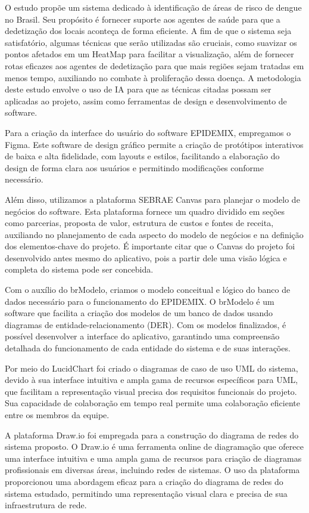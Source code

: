 O estudo propõe um sistema dedicado à identificação de áreas de risco de dengue no Brasil. Seu propósito é fornecer suporte aos agentes de saúde para que a dedetização dos locais aconteça de forma eficiente. A fim de que o sistema seja satisfatório, algumas técnicas que serão utilizadas são cruciais, como suavizar os pontos afetados em um HeatMap para facilitar a visualização, além de fornecer rotas eficazes aos agentes de dedetização para que mais regiões sejam tratadas em menos tempo, auxiliando no combate à proliferação dessa doença. A metodologia deste estudo envolve o uso de IA para que as técnicas citadas possam ser aplicadas ao projeto, assim como ferramentas de design e desenvolvimento de software. 

Para a criação da interface do usuário do software EPIDEMIX, empregamos o Figma. Este software de design gráfico permite a criação de protótipos interativos de baixa e alta fidelidade, com layouts e estilos, facilitando a elaboração do design de forma clara aos usuários e permitindo modificações conforme necessário.

Além disso, utilizamos a plataforma SEBRAE Canvas para planejar o modelo de negócios do software. Esta plataforma fornece um quadro dividido em seções como parcerias, proposta de valor, estrutura de custos e fontes de receita, auxiliando no planejamento de cada aspecto do modelo de negócios e na definição dos elementos-chave do projeto. É importante citar que o Canvas do projeto foi desenvolvido antes mesmo do aplicativo, pois a partir dele uma visão lógica e completa do sistema pode ser concebida.

Com o auxílio do brModelo, criamos o modelo conceitual e lógico do banco de dados necessário para o funcionamento do EPIDEMIX. O brModelo é um software que facilita a criação dos modelos de um banco de dados usando diagramas de entidade-relacionamento (DER). Com os modelos finalizados, é possível desenvolver a interface do aplicativo, garantindo uma compreensão detalhada do funcionamento de cada entidade do sistema e de suas interações.

Por meio do LucidChart foi criado o diagramas de caso de uso UML do sistema, devido à sua interface intuitiva e ampla gama de recursos específicos para UML, que facilitam a representação visual precisa dos requisitos funcionais do projeto. Sua capacidade de colaboração em tempo real permite uma colaboração eficiente entre os membros da equipe.

A plataforma Draw.io foi empregada para a construção do diagrama de redes do sistema proposto. O Draw.io é uma ferramenta online de diagramação que oferece uma interface intuitiva e uma ampla gama de recursos para criação de diagramas profissionais em diversas áreas, incluindo redes de sistemas. O uso da plataforma proporcionou uma abordagem eficaz para a criação do diagrama de redes do sistema estudado, permitindo uma representação visual clara e precisa de sua infraestrutura de rede.

